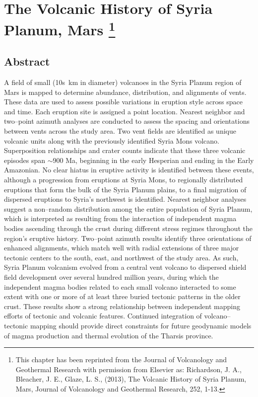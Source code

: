 \chapter[The Volcanic History of Syria Planum, Mars]{
The Volcanic History of Syria Planum, Mars \footnote{This chapter has been reprinted from the Journal of Volcanology and Geothermal Research with permission from Elsevier as: Richardson, J. A., Bleacher, J. E., Glaze, L. S., (2013), The Volcanic History of Syria Planum, Mars, Journal of Volcanology and Geothermal Research, 252, 1-13.}}\label{ch_syria}

\renewcommand*{\FigPath}{figures/chapter-syria_planum}

\section{Abstract}
A field of small (10s~km in diameter) volcanoes in the Syria Planum region of Mars is mapped to determine abundance, distribution, and alignments of vents.  These data are used to assess possible variations in eruption style across space and time. Each eruption site is assigned a point location. Nearest neighbor and two--point azimuth analyses are conducted to assess the spacing and orientations between vents across the study area. Two vent fields are identified as unique volcanic units along with the previously identified Syria Mons volcano.  Superposition relationships and crater counts indicate that these three volcanic episodes span $\sim$900 Ma, beginning in the early Hesperian and ending in the Early Amazonian. No clear hiatus in eruptive activity is identified between these events, although a progression from eruptions at Syria Mons, to regionally distributed eruptions that form the bulk of the Syria Planum plains, to a final migration of dispersed eruptions to Syria's northwest is identified. Nearest neighbor analyses suggest a non--random distribution among the entire population of Syria Planum, which is interpreted as resulting from the interaction of independent magma bodies ascending through the crust during different stress regimes throughout the region's eruptive history. Two--point azimuth results identify three orientations of enhanced alignments, which match well with radial extensions of three major tectonic centers to the south, east, and northwest of the study area. As such, Syria Planum volcanism evolved from a central vent volcano to dispersed shield field development over several hundred million years, during which the independent magma bodies related to each small volcano interacted to some extent with one or more of at least three buried tectonic patterns in the older crust.  These results show a strong relationship between independent mapping efforts of tectonic and volcanic features. Continued integration of volcano--tectonic mapping should provide direct constraints for future geodynamic models of magma production and thermal evolution of the Tharsis province.

